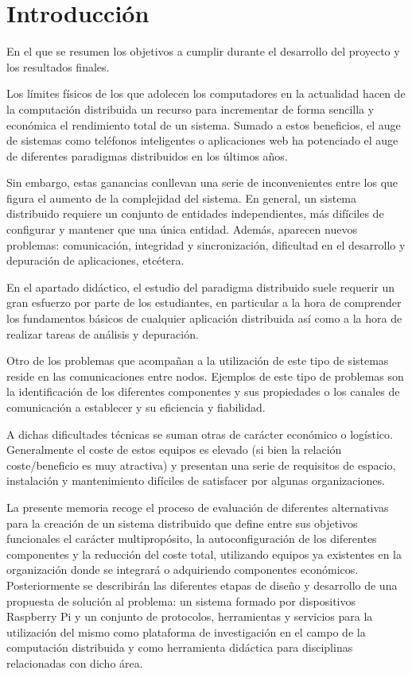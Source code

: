 \chapter{Introducción}

\begin{cabstract}
En el que se resumen los objetivos a cumplir durante el desarrollo del proyecto y los resultados finales.
\end{cabstract}

Los límites físicos de los que adolecen los computadores en la actualidad \cite{seth:physical} hacen de la computación distribuida un recurso para incrementar de forma sencilla y económica el rendimiento total de un sistema. Sumado a estos beneficios, el auge de sistemas como teléfonos inteligentes o aplicaciones web ha potenciado el auge de diferentes paradigmas distribuidos en los últimos años. 

Sin embargo, estas ganancias conllevan una serie de inconvenientes entre los que figura el aumento de la complejidad del sistema. En general, un sistema distribuido requiere un conjunto de entidades independientes, más difíciles de configurar y mantener que una única entidad. Además, aparecen nuevos problemas: comunicación, integridad y sincronización, dificultad en el desarrollo y depuración de aplicaciones, etcétera.

En el apartado didáctico, el estudio del paradigma distribuido suele requerir un gran esfuerzo por parte de los estudiantes, en particular a la hora de comprender los fundamentos básicos de cualquier aplicación distribuida así como a la hora de realizar tareas de análisis y depuración.

Otro de los problemas que acompañan a la utilización de este tipo de sistemas reside en las comunicaciones entre nodos. Ejemplos de este tipo de problemas son la identificación de los diferentes componentes y sus propiedades o los canales de comunicación a establecer y su eficiencia y fiabilidad.

A dichas dificultades técnicas se suman otras de carácter económico o logístico. Generalmente el coste de estos equipos es elevado (si bien la relación coste/beneficio es muy atractiva) y presentan una serie de requisitos de espacio, instalación y mantenimiento difíciles de satisfacer por algunas organizaciones.

La presente memoria recoge el proceso de evaluación de diferentes alternativas para la creación de un sistema distribuido que define entre sus objetivos funcionales el carácter multipropósito, la autoconfiguración de los diferentes componentes y la reducción del coste total, utilizando equipos ya existentes en la organización donde se integrará o adquiriendo componentes económicos. Posteriormente se describirán las diferentes etapas de diseño y desarrollo de una propuesta de solución al problema: un sistema formado por dispositivos Raspberry Pi y un conjunto de protocolos, herramientas y servicios para la utilización del mismo como plataforma de investigación en el campo de la computación distribuida y como herramienta didáctica para disciplinas relacionadas con dicho área.

